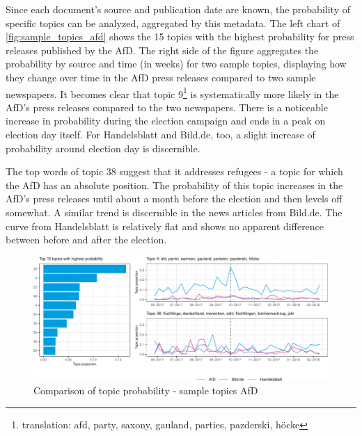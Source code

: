 \documentclass[
]{article}
\begin{document}
Since each document's source and publication date are known, the
probability of specific topics can be analyzed, aggregated by this
metadata. The left chart of \autoref{fig:sample_topics_afd} shows the 15
topics with the highest probability for press releases published by the
AfD. The right side of the figure aggregates the probability by source
and time (in weeks) for two sample topics, displaying how they change
over time in the AfD press releases compared to two sample newspapers.
It becomes clear that topic 9\footnote{translation: afd, party, saxony,
  gauland, parties, pazderski, höcke} is systematically more likely in
the AfD's press releases compared to the two newspapers. There is a
noticeable increase in probability during the election campaign and ends
in a peak on election day itself. For Handelsblatt and Bild.de, too, a
slight increase of probability around election day is discernible.

The top words of topic 38 suggest that it addresses refugees - a topic
for which the AfD has an absolute position. The probability of this
topic increases in the AfD's press releases until about a month before
the election and then levels off somewhat. A similar trend is
discernible in the news articles from Bild.de. The curve from
Handelsblatt is relatively flat and shows no apparent difference between
before and after the election.

\begin{figure}

{\centering \includegraphics[width=1\linewidth]{main_text_files/figure-latex/Top AfD topics-1} 

}

\caption{Comparison of topic probability - sample topics AfD \label{fig:sample_topics_afd}}\label{fig:Top AfD topics}
\end{figure}
\end{document}
